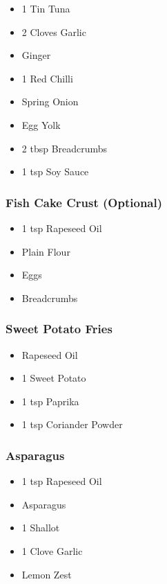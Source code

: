 \documentclass[11pt, english]{article}
\begin{document}
	\begin{itemize}
        \setlength\itemsep{0cm}
                \item 1 Tin Tuna
		\item 2 Cloves Garlic
		\item Ginger
		\item 1 Red Chilli
		\item Spring Onion
		\item Egg Yolk
		\item 2 tbsp Breadcrumbs
		\item 1 tsp Soy Sauce
        \end{itemize}

		\subsubsection*{Fish Cake Crust (Optional)}

	\begin{itemize}
        \setlength\itemsep{0cm}
                \item 1 tsp Rapeseed Oil
		\item Plain Flour
		\item Eggs
		\item Breadcrumbs
        \end{itemize}

		\subsubsection*{Sweet Potato Fries}

	\begin{itemize}
        \setlength\itemsep{0cm}
                \item Rapeseed Oil
		\item 1 Sweet Potato
		\item 1 tsp Paprika
		\item 1 tsp Coriander Powder
        \end{itemize}

		\subsubsection*{Asparagus}

	\begin{itemize}
        \setlength\itemsep{0cm}
                \item 1 tsp Rapeseed Oil
		\item Asparagus
		\item 1 Shallot
		\item 1 Clove Garlic
		\item Lemon Zest
        \end{itemize}
\end{document}
